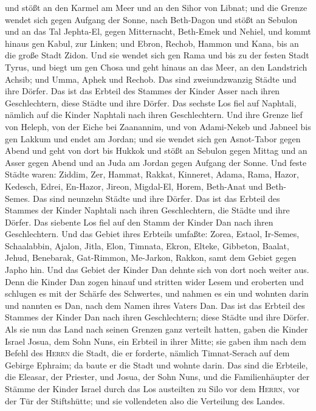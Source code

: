 und stößt an den Karmel am Meer und an den Sihor von Libnat;
 und die Grenze wendet sich gegen Aufgang der Sonne, nach
Beth-Dagon und stößt an Sebulon und an das Tal Jephta-El, gegen
Mitternacht, Beth-Emek und Nehiel, und kommt hinaus gen Kabul, zur
Linken;  und Ebron, Rechob, Hammon und Kana, bis an die
große Stadt Zidon.  Und sie wendet sich gen Rama und bis
zu der festen Stadt Tyrus, und biegt um gen Chosa und geht hinaus an das
Meer, an den Landstrich Achsib;  und Umma, Aphek und
Rechob. Das sind zweiundzwanzig Städte und ihre Dörfer. 
Das ist das Erbteil des Stammes der Kinder Asser nach ihren
Geschlechtern, diese Städte und ihre Dörfer.  Das sechste
Los fiel auf Naphtali, nämlich auf die Kinder Naphtali nach ihren
Geschlechtern.  Und ihre Grenze lief von Heleph, von der
Eiche bei Zaanannim, und von Adami-Nekeb und Jabneel bis gen Lakkum und
endet am Jordan;  und sie wendet sich gen Asnot-Tabor
gegen Abend und geht von dort bis Hukkok und stößt an Sebulon gegen
Mittag und an Asser gegen Abend und an Juda am Jordan gegen Aufgang der
Sonne.  Und feste Städte waren: Ziddim, 
Zer, Hammat, Rakkat, Kinneret, Adama,  Rama, Hazor,
Kedesch, Edrei, En-Hazor,  Jireon, Migdal-El, Horem,
Beth-Anat und Beth-Semes. Das sind neunzehn Städte und ihre Dörfer.
 Das ist das Erbteil des Stammes der Kinder Naphtali nach
ihren Geschlechtern, die Städte und ihre Dörfer.  Das
siebente Los fiel auf den Stamm der Kinder Dan nach ihren Geschlechtern.
 Und das Gebiet ihres Erbteils umfaßte: 
Zorea, Estaol, Ir-Semes, Schaalabbin,  Ajalon, Jitla,
Elon, Timnata, Ekron, Elteke,  Gibbeton, Baalat, Jehud,
Benebarak,  Gat-Rimmon, Me-Jarkon, Rakkon,
 samt dem Gebiet gegen Japho hin.  Und das
Gebiet der Kinder Dan dehnte sich von dort noch weiter aus. Denn die
Kinder Dan zogen hinauf und stritten wider Lesem und eroberten und
schlugen es mit der Schärfe des Schwertes, und nahmen es ein und wohnten
darin und nannten es Dan, nach dem Namen ihres Vaters Dan.
 Das ist das Erbteil des Stammes der Kinder Dan nach
ihren Geschlechtern; diese Städte und ihre Dörfer.  Als
sie nun das Land nach seinen Grenzen ganz verteilt hatten, gaben die
Kinder Israel Josua, dem Sohn Nuns, ein Erbteil in ihrer Mitte;
 sie gaben ihm nach dem Befehl des \textsc{Herrn} die
Stadt, die er forderte, nämlich Timnat-Serach auf dem Gebirge Ephraim;
da baute er die Stadt und wohnte darin.  Das sind die
Erbteile, die Eleasar, der Priester, und Josua, der Sohn Nuns, und die
Familienhäupter der Stämme der Kinder Israel durch das Los austeilten zu
Silo vor dem \textsc{Herrn}, vor der Tür der Stiftshütte; und sie
vollendeten also die Verteilung des Landes.

